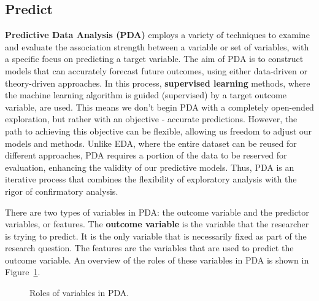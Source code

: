 \documentclass[
  letterpaper,
  DIV=11,
  numbers=noendperiod]{scrreprt}
\theoremstyle{definition}
\theoremstyle{remark}
\begin{document}
\subsection{Predict}\label{sec-aa-predict}

\textbf{Predictive Data Analysis (PDA)} employs a variety of techniques
to examine and evaluate the association strength between a variable or
set of variables, with a specific focus on predicting a target variable.
The aim of PDA is to construct models that can accurately forecast
future outcomes, using either data-driven or theory-driven approaches.
In this process, \textbf{supervised learning} methods, where the machine
learning algorithm is guided (supervised) by a target outcome variable,
are used. This means we don't begin PDA with a completely open-ended
exploration, but rather with an objective - accurate predictions.
However, the path to achieving this objective can be flexible, allowing
us freedom to adjust our models and methods. Unlike EDA, where the
entire dataset can be reused for different approaches, PDA requires a
portion of the data to be reserved for evaluation, enhancing the
validity of our predictive models. Thus, PDA is an iterative process
that combines the flexibility of exploratory analysis with the rigor of
confirmatory analysis.

There are two types of variables in PDA: the outcome variable and the
predictor variables, or features. The \textbf{outcome variable} is the
variable that the researcher is trying to predict. It is the only
variable that is necessarily fixed as part of the research question. The
features are the variables that are used to predict the outcome
variable. An overview of the roles of these variables in PDA is shown in
Figure~\ref{fig-pda-variables}.

\begin{figure}[H]


\caption{\label{fig-pda-variables}Roles of variables in PDA.}

\end{figure}%
\end{document}
